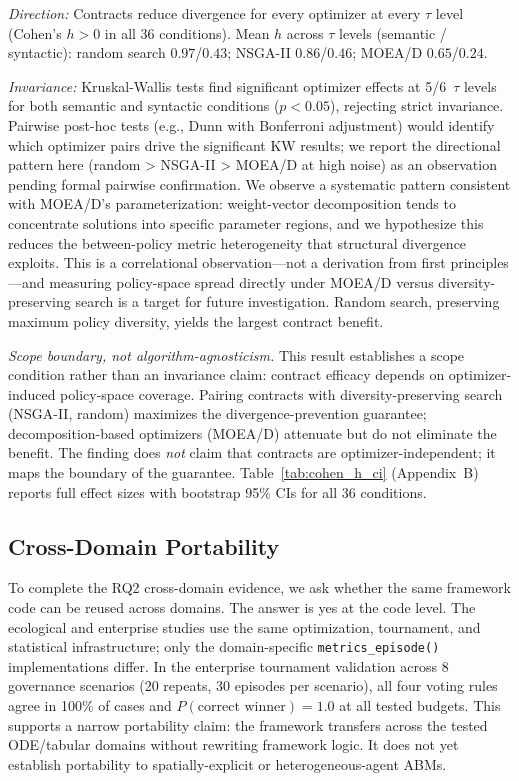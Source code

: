 \documentclass{wscpaperproc}
\begin{document}
\emph{Direction:} Contracts reduce divergence for every optimizer at every
$\tau$ level (Cohen's $h\!>\!0$ in all 36 conditions). Mean $h$ across
$\tau$ levels (semantic / syntactic): random search $0.97$/$0.43$; NSGA-II
$0.86$/$0.46$; MOEA/D $0.65$/$0.24$.

\emph{Invariance:} Kruskal-Wallis tests find significant optimizer effects at
5/6~$\tau$ levels for both semantic and syntactic conditions ($p\!<\!0.05$),
rejecting strict invariance. Pairwise post-hoc tests (e.g., Dunn with Bonferroni
adjustment) would identify which optimizer pairs drive the significant KW results;
we report the directional pattern here (random > NSGA-II > MOEA/D at high noise)
as an observation pending formal pairwise confirmation. We observe a systematic
pattern consistent with MOEA/D's parameterization: weight-vector decomposition
tends to concentrate solutions into specific parameter regions, and we hypothesize
this reduces the between-policy metric heterogeneity that structural divergence
exploits. This is a correlational observation---not a derivation from first
principles---and measuring policy-space spread directly under MOEA/D versus
diversity-preserving search is a target for future investigation. Random search,
preserving maximum policy diversity, yields the largest contract benefit.

\emph{Scope boundary, not algorithm-agnosticism.} This result establishes a
scope condition rather than an invariance claim: contract efficacy depends on
optimizer-induced policy-space coverage. Pairing contracts with diversity-preserving
search (NSGA-II, random) maximizes the divergence-prevention guarantee;
decomposition-based optimizers (MOEA/D) attenuate but do not eliminate the benefit.
The finding does \emph{not} claim that contracts are optimizer-independent; it
maps the boundary of the guarantee. Table~\ref{tab:cohen_h_ci} (Appendix~B)
reports full effect sizes with bootstrap 95\% CIs for all 36 conditions.



\subsection{Cross-Domain Portability}
\label{sec:crossdomain}

To complete the RQ2 cross-domain evidence, we ask whether the same framework
code can be reused across domains. The answer is yes at the code level. The ecological and
enterprise studies use the same optimization, tournament, and statistical
infrastructure; only the domain-specific \texttt{metrics\_episode()}
implementations differ. In the enterprise tournament validation across 8
governance scenarios (20 repeats, 30 episodes per scenario), all four voting
rules agree in 100\% of cases and $P(\text{correct winner})\!=\!1.0$ at all
tested budgets. This supports a narrow portability claim: the framework
transfers across the tested ODE/tabular domains without rewriting framework
logic. It does not yet establish portability to spatially-explicit or
heterogeneous-agent ABMs.
\end{document}
